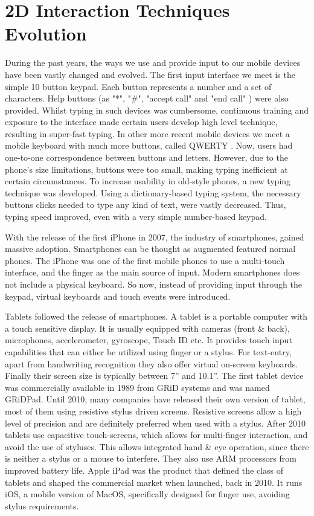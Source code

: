 \section{2D Interaction Techniques Evolution}


During the past years, the ways we use and provide input to our mobile devices have been vastly changed and evolved. The first input interface we meet is the simple 10 button keypad. Each button represents a number and a set of characters. Help buttons (as "*", "\#", "accept call" and "end call" ) were also provided. Whilst typing in such devices was cumbersome, continuous training and exposure to the interface made certain users develop high level technique, resulting in super-fast typing. 
In other more recent mobile devices we meet a mobile keyboard with much more buttons, called QWERTY \cite{qwerty}. Now, users had one-to-one correspondence between buttons and letters. However, due to the phone's size limitations, buttons were too small, making typing inefficient at certain circumstances.
To increase usability in old-style phones, a new typing technique was developed. Using a dictionary-based typing system, the necessary buttons clicks needed to type any kind of text, were vastly decreased. Thus, typing speed improved, even with a very simple number-based keypad. 

With the release of the first iPhone \cite{iphone} in 2007, the industry of smartphones, gained massive adoption. Smartphones can be thought as augmented featured normal phones. The iPhone was one of the first mobile phones to use a multi-touch interface, and the finger as the main source of input. Modern smartphones does not include a physical keyboard. 
So now, instead of providing input through the keypad, virtual keyboards and touch events were introduced. 

Tablets followed the release of smartphones. A tablet is a portable computer with a touch sensitive display. It is usually equipped with cameras (front \& back), microphones, accelerometer, gyroscope, Touch ID \cite{touchID} etc. It provides touch input capabilities that can either be utilized using finger or a stylus. For text-entry, apart from handwriting recognition they also offer virtual on-screen keyboards. Finally their screen size is typically between 7'' and 10.1''.
The first tablet device was commercially available in 1989 from GRiD systems and was named GRiDPad. Until 2010, many companies have released their own version of tablet, most of them using resistive stylus driven screens. Resistive screens allow a high level of precision and are definitely preferred when used with a stylus.
After 2010 tablets use capacitive touch-screens, which allows for multi-finger interaction, and avoid the use of styluses. This allows integrated hand \& eye operation, since there is neither a stylus or a mouse to interfere. They also use ARM processors from improved battery life. Apple iPad was the product that defined the class of tablets and shaped the commercial market when launched, back in 2010. It runs iOS, a mobile version of MacOS, specifically designed for finger use, avoiding stylus requirements. 

